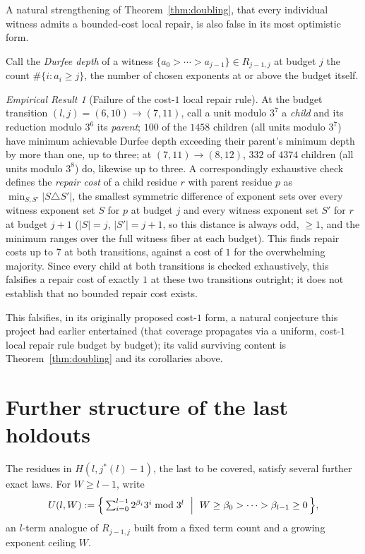\documentclass[11pt]{amsart}
\theoremstyle{plain}
\theoremstyle{definition}
\theoremstyle{remark}
\newtheorem{empresult}[theorem]{Empirical Result}
\begin{document}
A natural strengthening of Theorem~\ref{thm:doubling}, that every individual witness admits a
bounded-cost local repair, is also false in its most optimistic form.

Call the \emph{Durfee depth} of a witness $\{a_0>\cdots>a_{j-1}\}\in R_{j-1,j}$ at budget $j$ the
count $\#\{i : a_i \ge j\}$, the number of chosen exponents at or above the budget itself.

\begin{empresult}[Failure of the cost-$1$ local repair rule]
\label{er:falsify}
At the budget transition $(l,j)=(6,10)\to(7,11)$, call a unit modulo $3^7$ a \emph{child} and its
reduction modulo $3^6$ its \emph{parent}; $100$ of the $1458$ children (all units modulo $3^7$) have
minimum achievable Durfee depth exceeding their parent's minimum depth by more than one, up to
three; at $(7,11)\to(8,12)$, $332$ of $4374$ children (all units modulo $3^8$) do, likewise up to
three. A correspondingly exhaustive check defines the \emph{repair cost} of a child residue $r$ with
parent residue $p$ as $\min_{S,S'}|S\triangle S'|$, the smallest symmetric difference of exponent
sets over every witness exponent set $S$ for $p$ at budget $j$ and every witness exponent set $S'$
for $r$ at budget $j+1$ ($|S|=j$,
$|S'|=j+1$, so this distance is always odd, $\ge1$, and the minimum ranges over the full witness
fiber at each budget). This finds repair costs up to $7$ at both
transitions, against a cost of $1$ for the overwhelming majority. Since every child at both
transitions is checked exhaustively, this falsifies a repair cost of exactly $1$ at these two
transitions outright; it does not establish that no bounded repair cost exists.
\end{empresult}

This falsifies, in its originally proposed cost-$1$ form, a natural conjecture this project had
earlier entertained (that coverage propagates via a uniform, cost-$1$ local repair rule budget by
budget); its valid surviving content is Theorem~\ref{thm:doubling} and its corollaries above.

\section{Further structure of the last holdouts}
\label{sec:further}

The residues in $H(l,j^*(l)-1)$, the last to be covered, satisfy several further exact laws. For
$W\ge l-1$, write
\[
U(l,W) := \Bigl\{\, \textstyle\sum_{i=0}^{l-1} 2^{\beta_i}3^i \bmod 3^l \ \Bigm|\
W\ge\beta_0>\cdots>\beta_{l-1}\ge0 \,\Bigr\},
\]
an $l$-term analogue of $R_{j-1,j}$ built from a fixed term count and a growing exponent ceiling
$W$.
\end{document}
